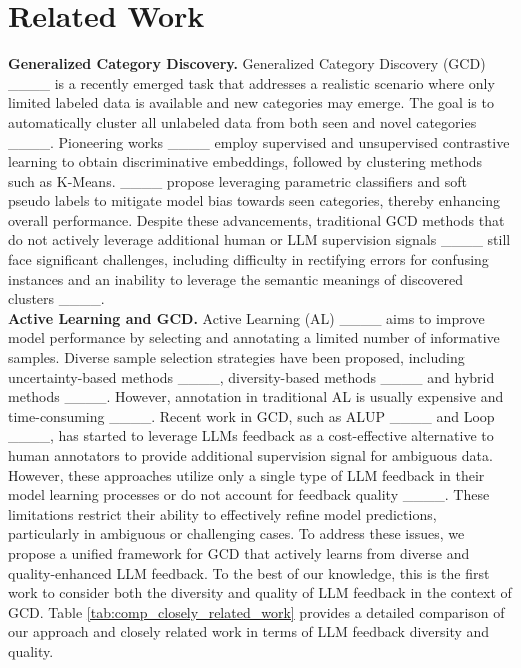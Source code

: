 \section{Related Work}

\noindent \textbf{Generalized Category Discovery. }
Generalized Category Discovery (GCD) ____ is a recently emerged task that addresses a realistic scenario where only limited labeled data is available and new categories may emerge. The goal is to automatically cluster all unlabeled data from both seen and novel categories ____. Pioneering works ____ employ supervised and unsupervised contrastive learning to obtain discriminative embeddings, followed by clustering methods such as K-Means. ____ propose leveraging parametric classifiers and soft pseudo labels to mitigate model bias towards seen categories, thereby enhancing overall performance. Despite these advancements, traditional GCD methods that do not actively leverage additional human or LLM supervision signals ____ still face significant challenges, including difficulty in rectifying errors for confusing instances and an inability to leverage the semantic meanings of discovered clusters ____. \\


\noindent \textbf{Active Learning and GCD. }
Active Learning (AL) ____ aims to improve model performance by selecting and annotating a limited number of informative samples. Diverse sample selection strategies have been proposed, including uncertainty-based methods ____, diversity-based methods ____ and hybrid methods ____. However, annotation in traditional AL is usually expensive and time-consuming ____. Recent work in GCD, such as ALUP ____ and Loop ____, has started to leverage LLMs feedback as a cost-effective alternative to human annotators to provide additional supervision signal for ambiguous data. However, these approaches utilize only a single type of LLM feedback in their model learning processes or do not account for feedback quality ____. These limitations restrict their ability to effectively refine model predictions, particularly in ambiguous or challenging cases. To address these issues, we propose a unified framework for GCD that actively learns from diverse and quality-enhanced LLM feedback. To the best of our knowledge, this is the first work to consider both the diversity and quality of LLM feedback in the context of GCD. Table \ref{tab:comp_closely_related_work} provides a detailed comparison of our approach and closely related work in terms of LLM feedback diversity and quality.


